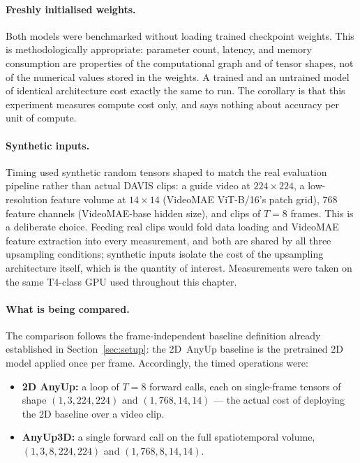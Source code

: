 \paragraph{Freshly initialised weights.}
Both models were benchmarked without loading trained checkpoint weights.
This is methodologically appropriate: parameter count, latency, and memory consumption are properties of the computational graph and of tensor shapes, not of the numerical values stored in the weights.
A trained and an untrained model of identical architecture cost exactly the same to run.
The corollary is that this experiment measures compute cost only, and says nothing about accuracy per unit of compute.

\paragraph{Synthetic inputs.}
Timing used synthetic random tensors shaped to match the real evaluation pipeline rather than actual DAVIS clips: a guide video at $224 \times 224$, a low-resolution feature volume at $14 \times 14$ (VideoMAE ViT-B/16's patch grid), $768$ feature channels (VideoMAE-base hidden size), and clips of $T = 8$ frames.
This is a deliberate choice.
Feeding real clips would fold data loading and VideoMAE feature extraction into every measurement, and both are shared by all three upsampling conditions; synthetic inputs isolate the cost of the upsampling architecture itself, which is the quantity of interest.
Measurements were taken on the same T4-class GPU used throughout this chapter.

\paragraph{What is being compared.}
The comparison follows the frame-independent baseline definition already established in Section~\ref{sec:setup}: the 2D~AnyUp baseline is the pretrained 2D model applied once per frame.
Accordingly, the timed operations were:

\begin{itemize}
    \item \textbf{2D AnyUp:} a loop of $T = 8$ forward calls, each on single-frame tensors of shape $(1, 3, 224, 224)$ and $(1, 768, 14, 14)$ --- the actual cost of deploying the 2D baseline over a video clip.
    \item \textbf{AnyUp3D:} a single forward call on the full spatiotemporal volume, $(1, 3, 8, 224, 224)$ and $(1, 768, 8, 14, 14)$.
\end{itemize}

